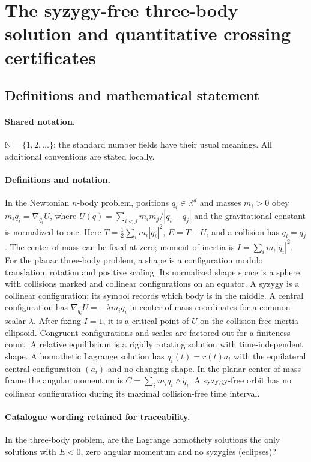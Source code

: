 \documentclass[11pt]{article}
\begin{document}
\section{The syzygy-free three-body solution and quantitative crossing certificates}\label{statement}

\subsection{Definitions and mathematical statement}

\paragraph{Shared notation.}$\mathbb N=\{1,2,\ldots\}$; the standard number fields have their usual meanings. All additional conventions are stated locally.


\paragraph{Definitions and notation.}In the Newtonian $n$-body problem, positions $q_i\in\mathbb R^d$ and masses $m_i>0$ obey $m_i\ddot q_i=\nabla_{q_i}U$, where $U(q)=\sum_{i<j}m_im_j/|q_i-q_j|$ and the gravitational constant is normalized to one. Here $T=\tfrac12\sum_i m_i|\dot q_i|^2$, $E=T-U$, and a collision has $q_i=q_j$. The center of mass can be fixed at zero; moment of inertia is $I=\sum_i m_i|q_i|^2$. For the planar three-body problem, a shape is a configuration modulo translation, rotation and positive scaling. Its normalized shape space is a sphere, with collisions marked and collinear configurations on an equator. A syzygy is a collinear configuration; its symbol records which body is in the middle. A central configuration has $\nabla_{q_i}U=-\lambda m_iq_i$ in center-of-mass coordinates for a common scalar $\lambda$. After fixing $I=1$, it is a critical point of $U$ on the collision-free inertia ellipsoid. Congruent configurations and scales are factored out for a finiteness count. A relative equilibrium is a rigidly rotating solution with time-independent shape. A homothetic Lagrange solution has $q_i(t)=r(t)a_i$ with the equilateral central configuration $(a_i)$ and no changing shape. In the planar center-of-mass frame the angular momentum is $C=\sum_i m_iq_i\wedge\dot q_i$. A syzygy-free orbit has no collinear configuration during its maximal collision-free time interval.

\paragraph{Catalogue wording retained for traceability.}
In the three-body problem, are the Lagrange homothety solutions the only solutions with $E<0$, zero angular momentum and no syzygies (eclipses)?
\end{document}
